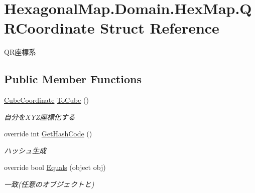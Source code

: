 \hypertarget{struct_hexagonal_map_1_1_domain_1_1_hex_map_1_1_q_r_coordinate}{}\section{Hexagonal\+Map.\+Domain.\+Hex\+Map.\+Q\+R\+Coordinate Struct Reference}
\label{struct_hexagonal_map_1_1_domain_1_1_hex_map_1_1_q_r_coordinate}


Q\+R座標系  


\subsection*{Public Member Functions}
\begin{DoxyCompactItemize}
\item 
\mbox{\hyperlink{struct_hexagonal_map_1_1_domain_1_1_hex_map_1_1_cube_coordinate}{Cube\+Coordinate}} \mbox{\hyperlink{struct_hexagonal_map_1_1_domain_1_1_hex_map_1_1_q_r_coordinate_a612e6e65edbcf51cdfe04e196dfe4baa}{To\+Cube}} ()
\begin{DoxyCompactList}\small\item\em 自分を\+X\+Y\+Z座標化する \end{DoxyCompactList}\item 
override int \mbox{\hyperlink{struct_hexagonal_map_1_1_domain_1_1_hex_map_1_1_q_r_coordinate_af2feec7d7649255353d92a11afdbce44}{Get\+Hash\+Code}} ()
\begin{DoxyCompactList}\small\item\em ハッシュ生成 \end{DoxyCompactList}\item 
override bool \mbox{\hyperlink{struct_hexagonal_map_1_1_domain_1_1_hex_map_1_1_q_r_coordinate_a82851923eac2c88beeac70d9117e5cc0}{Equals}} (object obj)
\begin{DoxyCompactList}\small\item\em 一致(任意のオブジェクトと) \end{DoxyCompactList}\end{DoxyCompactItemize}
